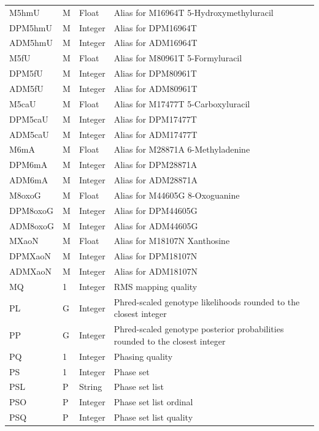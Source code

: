 \documentclass[8pt]{article}
\begin{document}
\begin{longtable}[c]{ | p{2.5cm} | p{1.5cm} | p{1.5cm} | p{10.3cm} | }
      M5hmU   	& M         & Float     & Alias for M16964T 5-Hydroxymethyluracil \\
      DPM5hmU   & M         & Integer   & Alias for DPM16964T \\
      ADM5hmU	& M         & Integer   & Alias for ADM16964T \\
      M5fU   	& M         & Float     & Alias for M80961T 5-Formyluracil \\
      DPM5fU  	& M         & Integer   & Alias for DPM80961T \\
      ADM5fU  	& M         & Integer   & Alias for ADM80961T \\
      M5caU   	& M         & Float     & Alias for M17477T 5-Carboxyluracil \\
      DPM5caU   & M         & Integer   & Alias for DPM17477T \\
      ADM5caU   & M         & Integer   & Alias for ADM17477T \\
      M6mA   	& M         & Float     & Alias for M28871A 6-Methyladenine \\
      DPM6mA   	& M         & Integer   & Alias for DPM28871A \\
      ADM6mA   	& M         & Integer   & Alias for ADM28871A \\
      M8oxoG   	& M         & Float     & Alias for M44605G 8-Oxoguanine \\
      DPM8oxoG  & M         & Integer   & Alias for DPM44605G \\
      ADM8oxoG  & M         & Integer   & Alias for ADM44605G \\
      MXaoN   	& M         & Float     & Alias for M18107N Xanthosine \\
      DPMXaoN   & M         & Integer   & Alias for DPM18107N \\
      ADMXaoN   & M         & Integer   & Alias for ADM18107N \\
      MQ		& 1			& Integer	& RMS mapping quality \\
      PL		& G			& Integer	& Phred-scaled genotype likelihoods rounded to the closest integer \\
      PP		& G			& Integer	& Phred-scaled genotype posterior probabilities rounded to the closest integer \\
      PQ		& 1			& Integer	& Phasing quality \\
      PS		& 1			& Integer	& Phase set \\
      PSL		& P			& String	& Phase set list \\
      PSO		& P			& Integer	& Phase set list ordinal \\
      PSQ		& P			& Integer	& Phase set list quality \\

\end{longtable}
\end{document}
